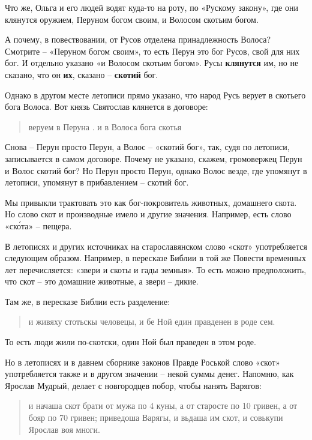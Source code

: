 \documentclass[a5paper,11pt,openany]{article}
\begin{document}
Что же, Ольга и его людей водят куда-то на роту, по «Рускому закону», где они клянутся оружием, Перуном богом своим, и Волосом скотьим богом. 

 А почему, в повествовании, от Русов отделена принадлежность Волоса? Смотрите – «Перуном богом своим», то есть Перун это бог Русов, свой для них бог. И отдельно указано «и Волосом скотьим богом». Русы \textbf{клянутся} им, но не сказано, что он \textbf{их}, сказано – \textbf{скотий} бог.

Однако в другом месте летописи прямо указано, что народ Русь верует в скотьего бога Волоса. Вот князь Святослав клянется в договоре:

\begin{quotation}
\noindent веруем в Перуна . и в Волоса бога скотья
\end{quotation}

 Снова – Перун просто Перун, а Волос – «скотий бог», так, судя по летописи, записывается в самом договоре. Почему не указано, скажем, громовержец Перун и Волос скотий бог? Но Перун просто Перун, однако Волос везде, где упомянут в летописи, упомянут в прибавлением – скотий бог.

  Мы привыкли трактовать это как бог-покровитель животных, домашнего скота. Но слово скот и производные имело и другие значения. Например, есть слово «ск\'ота» – пещера.

  В летописях и других источниках на старославянском слово «скот» употребляется следующим образом. Например, в пересказе Библии в той же Повести временных лет перечисляется: «звери и скоты и гады земныя». То есть можно предположить, что скот – это домашние животные, а звери – дикие.

Там же, в пересказе Библии есть разделение:

\begin{quotation}
\noindent и живяху стотьскы человецы, и бе Ной един правденен в роде сем.
\end{quotation}

   То есть люди жили по-скотски, один Ной был праведен в этом роде.

Но в летописях и в давнем сборнике законов Правде Роськой слово «скот» употребляется также и в другом значении – некой суммы денег. Напомню, как Ярослав Мудрый, делает с новгородцев побор, чтобы нанять Варягов:

\begin{quotation}
\noindent и начаша скот брати от мужа по 4 куны, а от старосте по 10 гривен, а от бояр по 70
гривен; приведоша Варягы, и вьдаша им скот, и совькупи Ярослав воя многи.
\end{quotation}
\end{document}
